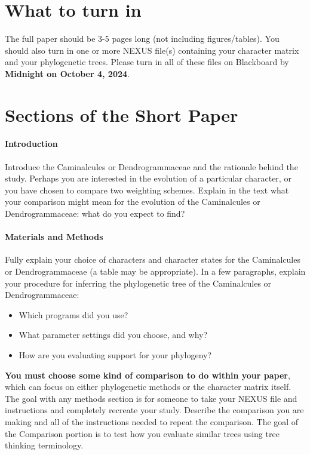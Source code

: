 \documentclass[12pt]{article}
\begin{document}
\section{What to turn in}

The full paper should be 3-5 pages long (not including figures/tables).
You should also turn in one or more NEXUS file(s) containing your character matrix and your phylogenetic trees.
Please turn in all of these files on Blackboard by \textbf{Midnight on October 4, 2024}.

\section{Sections of the Short Paper}

\paragraph{Introduction}
Introduce the Caminalcules or Dendrogrammaceae and the rationale behind the study. 
Perhaps you are interested in the evolution of a particular character, or you have chosen to compare two weighting schemes.
Explain in the text what your comparison might mean for the evolution of the Caminalcules or Dendrogrammaceae: what do you expect to find?

\paragraph{Materials and Methods}
Fully explain your choice of characters and character states for the Caminalcules or Dendrogrammaceae (a table may be appropriate).
In a few paragraphs, explain your procedure for inferring the phylogenetic tree of the Caminalcules or Dendrogrammaceae:
\begin{itemize}
\itemsep0em
\item Which programs did you use? 
\item What parameter settings did you choose, and why?
\item How are you evaluating support for your phylogeny?
\end{itemize}

\textbf{You must choose some kind of comparison to do within your paper}, which can focus on either phylogenetic methods or the character matrix itself.
The goal with any methods section is for someone to take your NEXUS file and instructions and completely recreate your study.
Describe the comparison you are making and all of the instructions needed to repeat the comparison.
The goal of the Comparison portion is to test how you evaluate similar trees using tree thinking terminology.
\end{document}

